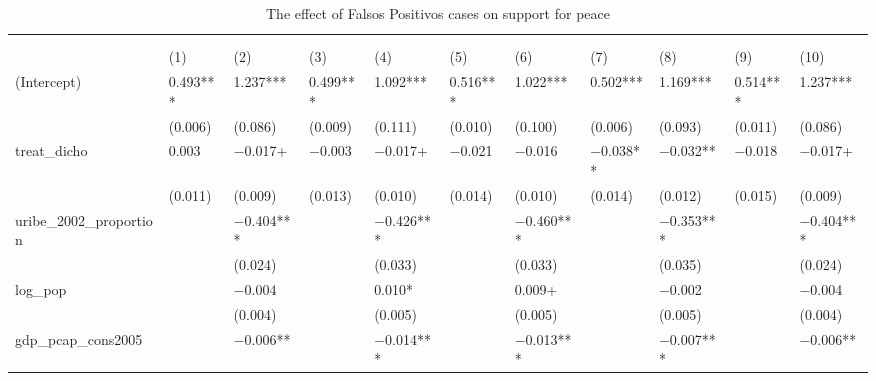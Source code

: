 \documentclass[
]{article}
\begin{document}
\begin{table}
\centering\centering
\caption{\label{tab:all models table}The effect of Falsos Positivos cases on support for peace}
\centering
\fontsize{8}{10}\selectfont
\begin{tabu} to 
\toprule
{} &  &  \\
\cmidrule(l{3pt}r{3pt}){4-7} \cmidrule(l{3pt}r{3pt}){8-11}
 &  &  &  &  &  \\
\cmidrule(l{3pt}r{3pt}){2-2} \cmidrule(l{3pt}r{3pt}){3-3} \cmidrule(l{3pt}r{3pt}){4-5} \cmidrule(l{3pt}r{3pt}){6-9} \cmidrule(l{3pt}r{3pt}){10-11}
  & (1) & (2) & (3) & (4) & (5) & (6) & (7) & (8) & (9) & (10)\\
\midrule
(Intercept) & \num{0.493}*** & \num{1.237}*** & \num{0.499}*** & \num{1.092}*** & \num{0.516}*** & \num{1.022}*** & \num{0.502}*** & \num{1.169}*** & \num{0.514}*** & \num{1.237}***\\
 & (\num{0.006}) & (\num{0.086}) & (\num{0.009}) & (\num{0.111}) & (\num{0.010}) & (\num{0.100}) & (\num{0.006}) & (\num{0.093}) & (\num{0.011}) & (\num{0.086})\\
treat_dicho & \num{0.003} & \num{-0.017}+ & \num{-0.003} & \num{-0.017}+ & \num{-0.021} & \num{-0.016} & \num{-0.038}** & \num{-0.032}** & \num{-0.018} & \num{-0.017}+\\
 & (\num{0.011}) & (\num{0.009}) & (\num{0.013}) & (\num{0.010}) & (\num{0.014}) & (\num{0.010}) & (\num{0.014}) & (\num{0.012}) & (\num{0.015}) & (\num{0.009})\\
uribe_2002_proportion &  & \num{-0.404}*** &  & \num{-0.426}*** &  & \num{-0.460}*** &  & \num{-0.353}*** &  & \num{-0.404}***\\
 &  & (\num{0.024}) &  & (\num{0.033}) &  & (\num{0.033}) &  & (\num{0.035}) &  & (\num{0.024})\\
log_pop &  & \num{-0.004} &  & \num{0.010}* &  & \num{0.009}+ &  & \num{-0.002} &  & \num{-0.004}\\
 &  & (\num{0.004}) &  & (\num{0.005}) &  & (\num{0.005}) &  & (\num{0.005}) &  & (\num{0.004})\\
gdp_pcap_cons2005 &  & \num{-0.006}** &  & \num{-0.014}*** &  & \num{-0.013}*** &  & \num{-0.007}*** &  & \num{-0.006}**\\

\end{tabu}
\end{table}
\end{document}
